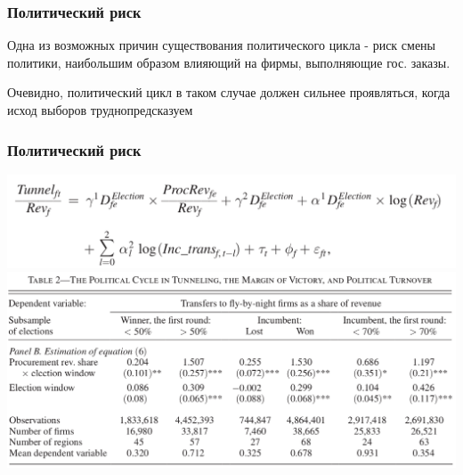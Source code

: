 \begin{frame}
\frametitle{Политический риск}
Одна из возможных причин существования политического цикла - риск смены политики, наибольшим образом влияющий на фирмы, выполняющие гос. заказы.\\
\vspace{3mm}

Очевидно, политический цикл в таком случае должен сильнее проявляться, когда исход выборов труднопредсказуем\\
\vspace{3mm}
\end{frame}

\begin{frame}
\frametitle{Политический риск}
\includegraphics[scale=0.25]{images/prisk1}
\includegraphics[scale=0.25]{images/prisk2}
\end{frame}
